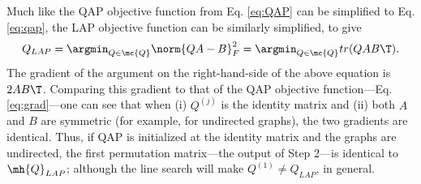 \documentclass[10pt,journal,cspaper,compsoc]{IEEEtran}
\begin{document}
Much like the QAP objective function from Eq. \eqref{eq:QAP} can be simplified to Eq. \eqref{eq:qap}, the LAP objective function can be similarly simplified, to give
\begin{align}
	Q_{LAP}= \argmin_{Q \in \mc{Q}} \norm{QA-B}_F^2 = \argmin_{Q \in \mc{Q}} tr(QA B\T).
\end{align}
The gradient of the argument on the right-hand-side of the above equation is $2AB\T$.
Comparing this gradient to that of the QAP objective function---Eq. \eqref{eq:grad}---one can see that when (i) $Q^{(j)}$ is the identity matrix and (ii) both $A$ and $B$ are symmetric (for example, for undirected graphs), the two gradients are identical.  Thus, if QAP is initialized at the identity matrix and the graphs are undirected, the first permutation matrix---the output of Step 2---is identical to $\mh{Q}_{LAP}$; although the line search will make $Q^{(1)} \neq Q_{LAP}$, in general.  %

\end{document}
